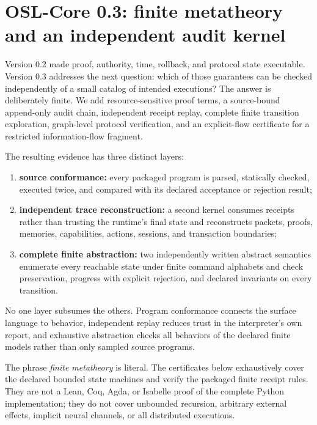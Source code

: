 \section{OSL-Core 0.3: finite metatheory and an independent audit kernel}
\label{sec:osl-core-v03}

Version 0.2 made proof, authority, time, rollback, and protocol state executable.  Version 0.3 addresses the next question: which of those guarantees can be checked independently of a small catalog of intended executions?  The answer is deliberately finite.  We add resource-sensitive proof terms, a source-bound append-only audit chain, independent receipt replay, complete finite transition exploration, graph-level protocol verification, and an explicit-flow certificate for a restricted information-flow fragment.

The resulting evidence has three distinct layers:
\begin{enumerate}[leftmargin=1.7em]
  \item \textbf{source conformance:} every packaged program is parsed, statically checked, executed twice, and compared with its declared acceptance or rejection result;
  \item \textbf{independent trace reconstruction:} a second kernel consumes receipts rather than trusting the runtime's final state and reconstructs packets, proofs, memories, capabilities, actions, sessions, and transaction boundaries;
  \item \textbf{complete finite abstraction:} two independently written abstract semantics enumerate every reachable state under finite command alphabets and check preservation, progress with explicit rejection, and declared invariants on every transition.
\end{enumerate}
No one layer subsumes the others.  Program conformance connects the surface language to behavior, independent replay reduces trust in the interpreter's own report, and exhaustive abstraction checks all behaviors of the declared finite models rather than only sampled source programs.

\begin{boundarybox}
The phrase \emph{finite metatheory} is literal.  The certificates below exhaustively cover the declared bounded state machines and verify the packaged finite receipt rules.  They are not a Lean, Coq, Agda, or Isabelle proof of the complete Python implementation; they do not cover unbounded recursion, arbitrary external effects, implicit neural channels, or all distributed executions.
\end{boundarybox}

